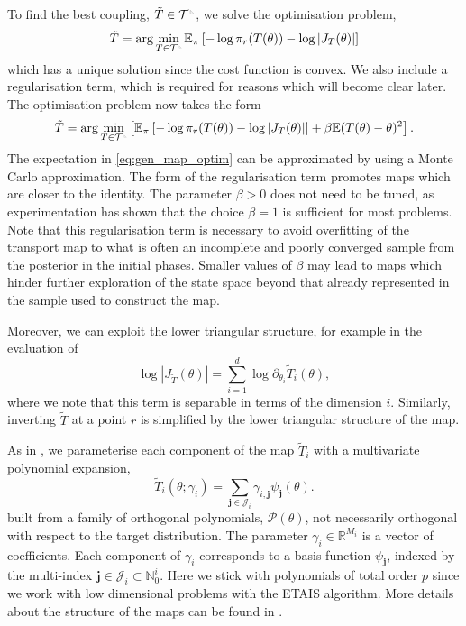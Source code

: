 \documentclass[final]{siamltex}
\newcommand{\edit}[1]{{\color{red} #1}}
\newcommand{\ltri}{%
\,\resizebox{!}{0.25\baselineskip}{%
\begin{tikzpicture}%
\draw[line width=1mm](0,0) -- (0,2) -- (2,0)  -- (0,0);
\end{tikzpicture}%
}\xspace%
}%
\newcommand{\smallltri}{%
\,\resizebox{!}{0.15\baselineskip}{%
\begin{tikzpicture}%
\draw[line width=1mm](0,0) -- (0,2) -- (2,0)  -- (0,0);
\end{tikzpicture}%
}\xspace%
}%
\begin{document}
To find the best coupling, $\tilde{T} \in \mathcal{T}^{\ltri}$, we solve the optimisation problem,
\begin{equation}
	\tilde{T} = \arg\min_{T \in \mathcal{T}^{\smallltri}} \mathbb{E}_\pi\left[-\log\pi_r(T(\theta)) -
		\log\left|J_T(\theta)\right|\right]
\end{equation}
which has a unique solution since the cost function is convex. We also include a regularisation term, which is required for reasons which will become clear later. The optimisation problem now takes the form
\begin{equation}\label{eq:gen_map_optim}
	\tilde{T} = \arg\min_{T\in\mathcal{T}^{\smallltri}} \left[
		 \mathbb{E}_\pi\left[-\log\pi_r(T(\theta)) -
		\log\left|J_T(\theta)\right|\right] + \beta\mathbb{E}(T(\theta)- \theta)^2 \right].
\end{equation}
\edit{The expectation in \eqref{eq:gen_map_optim} can be
approximated by using a Monte Carlo approximation. The form of the regularisation term promotes maps which are
closer to the identity. The parameter $\beta>0$ does not need to be tuned, as experimentation has shown that the choice
$\beta=1$ is sufficient for most problems. Note that this
regularisation term is necessary to avoid overfitting of the transport
map to what is often an incomplete and poorly converged sample from
the posterior in the initial phases. Smaller values of $\beta$ may lead to maps which
hinder further exploration of the state space beyond that already
represented in the sample used to construct the map.}

\edit{Moreover, we can exploit the lower triangular
  structure, for example in the evaluation of 
\begin{equation}\label{eqn:separable_jacobian}
	\log\left|J_{\tilde{T}}(\theta)\right| = \sum\limits_{i=1}^d \! \log \partial_{\theta_i} \tilde{T}_i(\theta),
\end{equation}
where we note that this term is separable in terms of the dimension
$i$. Similarly, inverting $\tilde{T}$ at a point $r$ is simplified by the lower triangular structure of the map.

As in \cite{parno2018transport}, we parameterise each component of the
map $\tilde{T}_i$ with a multivariate polynomial expansion,
\begin{equation}\label{eq:map_defn}
	\tilde{T}_i(\theta; \gamma_i) = \sum\limits_{\mathbf{j}\in\mathcal{J}_i} \!
\gamma_{i,\mathbf{j}}\psi_\mathbf{j}(\theta).
\end{equation}
built from
a family of orthogonal polynomials, $\mathcal{P}(\theta)$, not
necessarily orthogonal with respect to the target distribution. The parameter $\gamma_i \in \mathbb{R}^{M_i}$ is a vector of coefficients. Each component of $\gamma_i$ corresponds to a basis function
$\psi_\mathbf{j}$, indexed by the multi-index $\mathbf{j} \in
\mathcal{J}_i \subset \mathbb{N}_0^i$. 
Here we stick with polynomials of total order $p$ since we work with
low dimensional problems with the ETAIS algorithm. More details about
the structure of the maps can be found in  \cite{parno2018transport}.}
\end{document}
